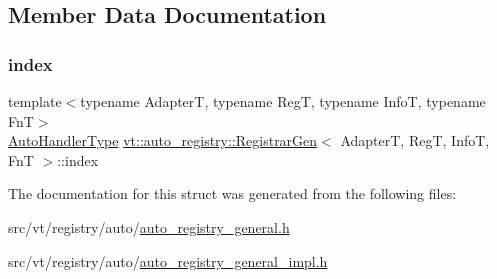 \subsection{Member Data Documentation}
\mbox{\label{structvt_1_1auto__registry_1_1_registrar_gen_aea0ee7667b56a5bc4541da4ae3d653ea}} 
\subsubsection{\texorpdfstring{index}{index}}
{\footnotesize\ttfamily template$<$typename AdapterT, typename RegT, typename InfoT, typename FnT$>$ \\
\hyperlink{namespacevt_1_1auto__registry_ae295e18699146815bb7d7674594d95d7}{Auto\+Handler\+Type} \hyperlink{structvt_1_1auto__registry_1_1_registrar_gen}{vt\+::auto\+\_\+registry\+::\+Registrar\+Gen}$<$ AdapterT, RegT, InfoT, FnT $>$\+::index}



The documentation for this struct was generated from the following files\+:\begin{DoxyCompactItemize}
\item 
src/vt/registry/auto/\hyperlink{auto__registry__general_8h}{auto\+\_\+registry\+\_\+general.\+h}\item 
src/vt/registry/auto/\hyperlink{auto__registry__general__impl_8h}{auto\+\_\+registry\+\_\+general\+\_\+impl.\+h}\end{DoxyCompactItemize}
